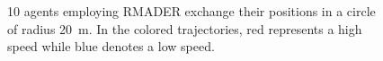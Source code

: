 \begin{figure}
{}
    \caption{10 agents employing RMADER exchange their positions in a circle of radius \SI{20}{\m}. In the colored trajectories, red represents a high speed while blue denotes a low speed.}
    \label{fig:rmader_sim1}
\end{figure}


